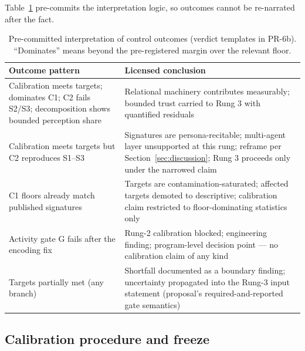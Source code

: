\documentclass[12pt, letterpaper]{article}
\begin{document}
Table~\ref{tab:interpretation} pre-commits the interpretation logic, so outcomes cannot be re-narrated after the fact.

\begin{table}[htbp]
\centering\small
\caption{Pre-committed interpretation of control outcomes (verdict templates in PR-6b). ``Dominates'' means beyond the pre-registered margin over the relevant floor.}
\label{tab:interpretation}
\begin{tabular}{p{5.6cm}p{7.2cm}}
\toprule
Outcome pattern & Licensed conclusion \\
\midrule
Calibration meets targets; dominates C1; C2 fails S2/S3; decomposition shows bounded perception share & Relational machinery contributes measurably; bounded trust carried to Rung 3 with quantified residuals \\
\midrule
Calibration meets targets but C2 reproduces S1--S3 & Signatures are persona-recitable; multi-agent layer unsupported at this rung; reframe per Section~\ref{sec:discussion}; Rung 3 proceeds only under the narrowed claim \\
\midrule
C1 floors already match published signatures & Targets are contamination-saturated; affected targets demoted to descriptive; calibration claim restricted to floor-dominating statistics only \\
\midrule
Activity gate G fails after the encoding fix & Rung-2 calibration blocked; engineering finding; program-level decision point --- no calibration claim of any kind \\
\midrule
Targets partially met (any branch) & Shortfall documented as a boundary finding; uncertainty propagated into the Rung-3 input statement (proposal's required-and-reported gate semantics) \\
\bottomrule
\end{tabular}
\end{table}

\subsection{Calibration procedure and freeze}
\label{sec:design:procedure}
\end{document}
